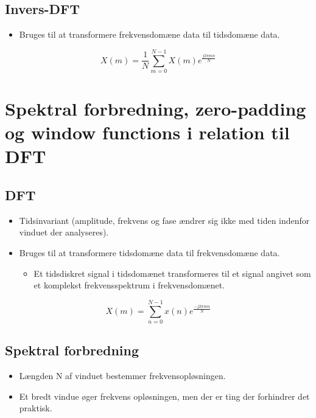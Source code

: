 \documentclass[danish]{article}
\begin{document}
\subsection{Invers-DFT}
\begin{itemize}
	\item Bruges til at transformere frekvensdomæne data til tidsdomæne data.
\end{itemize}

\begin{equation}
X(m)=\frac{1}{N}\sum_{m=0}^{N-1}X(m)e^{\frac{j2\pi mn}{N}}
\end{equation}



\newpage
\section{Spektral forbredning, zero-padding og window functions i relation til DFT}
\subsection{DFT}
\begin{itemize}
	\item Tidsinvariant (amplitude, frekvens og fase ændrer sig ikke med tiden indenfor vinduet der analyseres).
	\item Bruges til at transformere tidsdomæne data til frekvensdomæne data.
	\begin{itemize}
		\item Et tidsdiskret signal i tidsdomænet transformeres til et signal angivet som et komplekst frekvensspektrum i frekvensdomænet.
	\end{itemize}
\end{itemize}

\begin{equation}
X(m)=\sum_{n=0}^{N-1}x(n)e^{\frac{-j2\pi mn}{N}}
\end{equation}

\subsection{Spektral forbredning}
\begin{itemize}
	\item Længden N af vinduet bestemmer frekvensopløsningen.
	\item Et bredt vindue øger frekvens opløsningen, men der er ting der forhindrer det praktisk.
\end{itemize}
\end{document}
